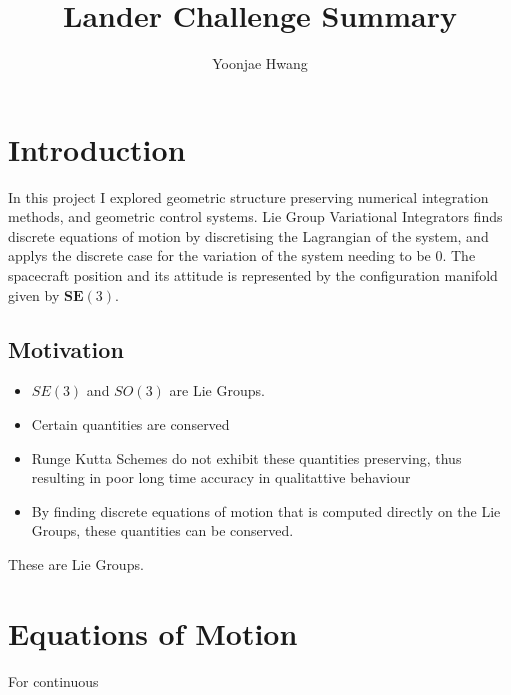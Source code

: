 \documentclass{article}
\title{Lander Challenge Summary}
\author{Yoonjae Hwang}
\begin{document}
\maketitle
\section{Introduction}
In this project I explored geometric structure preserving numerical integration methods, 
and geometric control systems. 
Lie Group Variational Integrators finds discrete equations of motion
by discretising the Lagrangian of the system, and applys the discrete case for the variation
of the system needing to be 0. 
The spacecraft position and its attitude is represented by the configuration manifold given by 
$\mathbf{SE}(3)$.
\subsection{Motivation}
\begin{itemize}
    \item $SE(3)$ and $SO(3)$ are Lie Groups. 
    \item Certain quantities are conserved
    \item Runge Kutta Schemes do not exhibit these quantities preserving, thus resulting in poor long time accuracy in qualitattive behaviour
    \item By finding discrete equations of motion that is computed directly on the Lie Groups, these quantities can be conserved.
\end{itemize}
These are Lie Groups.

\section{Equations of Motion}
For continuous
\end{document}
